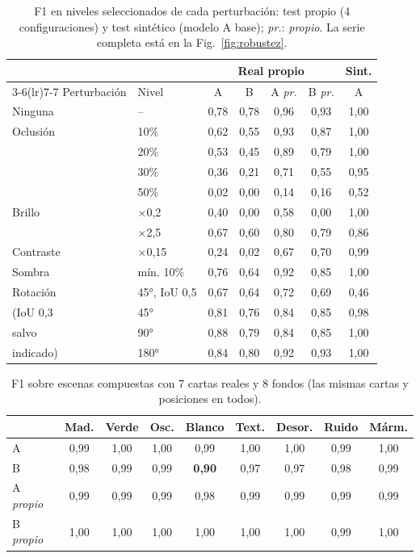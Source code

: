 \documentclass[conference,a4paper]{IEEEtran}
\begin{document}
\begin{table}[t]
\centering
\caption{F1 en niveles seleccionados de cada perturbación: test propio (4 configuraciones) y test sintético
(modelo A base); \emph{pr.}: \emph{propio}. La serie completa está en la Fig.~\ref{fig:robustez}.}
\label{tab:niveles}
\setlength{\tabcolsep}{3.5pt}
\begin{tabular}{llccccc}
\toprule
 & & \multicolumn{4}{c}{Real propio} & Sint. \\
\cmidrule(lr){3-6}\cmidrule(lr){7-7}
Perturbación & Nivel & A & B & A \emph{pr.} & B \emph{pr.} & A \\
\midrule
Ninguna    & --             & 0,78 & 0,78 & 0,96 & 0,93 & 1,00 \\
\midrule
Oclusión   & 10\%           & 0,62 & 0,55 & 0,93 & 0,87 & 1,00 \\
           & 20\%           & 0,53 & 0,45 & 0,89 & 0,79 & 1,00 \\
           & 30\%           & 0,36 & 0,21 & 0,71 & 0,55 & 0,95 \\
           & 50\%           & 0,02 & 0,00 & 0,14 & 0,16 & 0,52 \\
\midrule
Brillo     & $\times$0,2    & 0,40 & 0,00 & 0,58 & 0,00 & 1,00 \\
           & $\times$2,5    & 0,67 & 0,60 & 0,80 & 0,79 & 0,86 \\
Contraste  & $\times$0,15   & 0,24 & 0,02 & 0,67 & 0,70 & 0,99 \\
Sombra     & mín. 10\%      & 0,76 & 0,64 & 0,92 & 0,85 & 1,00 \\
\midrule
Rotación   & 45°, IoU 0,5   & 0,67 & 0,64 & 0,72 & 0,69 & 0,46 \\
(IoU 0,3   & 45°            & 0,81 & 0,76 & 0,84 & 0,85 & 0,98 \\
salvo      & 90°            & 0,88 & 0,79 & 0,84 & 0,85 & 1,00 \\
indicado)  & 180°           & 0,84 & 0,80 & 0,92 & 0,93 & 1,00 \\
\bottomrule
\end{tabular}
\end{table}

\begin{table}[t]
\centering
\caption{F1 sobre escenas compuestas con 7 cartas reales y 8 fondos (las mismas cartas y posiciones en todos).}
\label{tab:fondo}
\setlength{\tabcolsep}{2.6pt}
\begin{tabular}{lcccccccc}
\toprule
 & Mad. & Verde & Osc. & Blanco & Text. & Desor. & Ruido & Márm. \\
\midrule
A               & 0,99 & 1,00 & 1,00 & 0,99 & 1,00 & 1,00 & 0,99 & 1,00 \\
B               & 0,98 & 0,99 & 0,99 & \textbf{0,90} & 0,97 & 0,97 & 0,98 & 0,99 \\
A \emph{propio} & 0,99 & 0,99 & 0,99 & 0,98 & 0,99 & 0,99 & 0,99 & 0,99 \\
B \emph{propio} & 1,00 & 1,00 & 1,00 & 1,00 & 1,00 & 1,00 & 0,99 & 1,00 \\
\bottomrule
\end{tabular}
\end{table}
\end{document}
